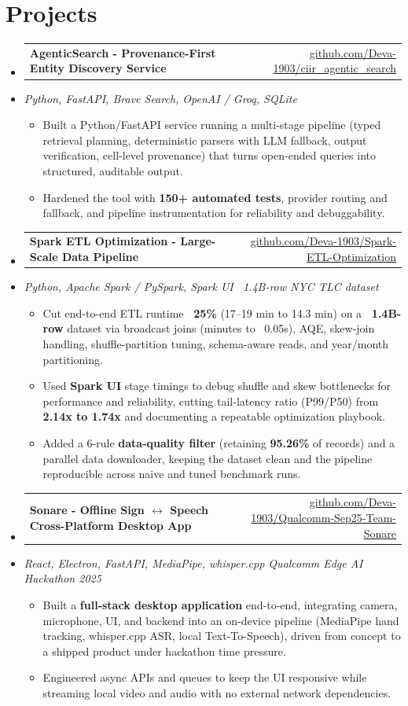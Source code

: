 \documentclass[letterpaper,10pt]{article}
\makeatletter
\newcommand{\resumeItem}[1]{
  \item\small{#1\vspace{-1pt}}
}
\newcommand{\resumeProjectHeading}[2]{
    \item
    \begin{tabular*}{0.985\textwidth}[t]{l@{\extracolsep{\fill}}r}
      \small\textbf{#1} & \small #2 \\
    \end{tabular*}\vspace{-5pt}
}
\newcommand{\resumeProjectSubheading}[1]{
  \vspace{-2pt}\item[] {\small\textcolor{ResumeSlate}{\emph{#1}}}\vspace{-3pt}
}
\newcommand{\resumeSubHeadingListStart}{\begin{itemize}[leftmargin=0.0in, label={}, itemsep=2pt, topsep=2pt]}
\newcommand{\resumeSubHeadingListEnd}{\end{itemize}}
\newcommand{\resumeItemListStart}{\begin{itemize}[leftmargin=0.18in, itemsep=2pt, topsep=1pt]}
\newcommand{\resumeItemListEnd}{\end{itemize}\vspace{-4pt}}
\makeatother
\begin{document}
\section{Projects}
\resumeSubHeadingListStart
  \resumeProjectHeading
    {AgenticSearch - Provenance-First Entity Discovery Service}
    {\href{https://github.com/Deva-1903/ciir_agentic_search}{github.com/Deva-1903/ciir\_agentic\_search}}
  \resumeProjectSubheading{Python, FastAPI, Brave Search, OpenAI / Groq, SQLite}
    \resumeItemListStart
      \resumeItem{Built a Python/FastAPI service running a multi-stage pipeline (typed retrieval planning, deterministic parsers with LLM fallback, output verification, cell-level provenance) that turns open-ended queries into structured, auditable output.}
      \resumeItem{Hardened the tool with \textbf{150+ automated tests}, provider routing and fallback, and pipeline instrumentation for reliability and debuggability.}
    \resumeItemListEnd
  \resumeProjectHeading
    {Spark ETL Optimization - Large-Scale Data Pipeline}
    {\href{https://github.com/Deva-1903/Spark-ETL-Optimization}{github.com/Deva-1903/Spark-ETL-Optimization}}
  \resumeProjectSubheading{Python, Apache Spark / PySpark, Spark UI \enspace\textbar\enspace ~1.4B-row NYC TLC dataset}
    \resumeItemListStart
      \resumeItem{Cut end-to-end ETL runtime \textbf{~25\%} (17--19 min to 14.3 min) on a \textbf{~1.4B-row} dataset via broadcast joins (minutes to ~0.05s), AQE, skew-join handling, shuffle-partition tuning, schema-aware reads, and year/month partitioning.}
      \resumeItem{Used \textbf{Spark UI} stage timings to debug shuffle and skew bottlenecks for performance and reliability, cutting tail-latency ratio (P99/P50) from \textbf{2.14x to 1.74x} and documenting a repeatable optimization playbook.}
      \resumeItem{Added a 6-rule \textbf{data-quality filter} (retaining \textbf{95.26\%} of records) and a parallel data downloader, keeping the dataset clean and the pipeline reproducible across naive and tuned benchmark runs.}
    \resumeItemListEnd
  \resumeProjectHeading
    {Sonare - Offline Sign \(\leftrightarrow\) Speech Cross-Platform Desktop App}
    {\href{https://github.com/Deva-1903/Qualcomm-Sep25-Team-Sonare}{github.com/Deva-1903/Qualcomm-Sep25-Team-Sonare}}
  \resumeProjectSubheading{React, Electron, FastAPI, MediaPipe, whisper.cpp \enspace\textbar\enspace Qualcomm Edge AI Hackathon 2025}
    \resumeItemListStart
      \resumeItem{Built a \textbf{full-stack desktop application} end-to-end, integrating camera, microphone, UI, and backend into an on-device pipeline (MediaPipe hand tracking, whisper.cpp ASR, local Text-To-Speech), driven from concept to a shipped product under hackathon time pressure.}
      \resumeItem{Engineered async APIs and queues to keep the UI responsive while streaming local video and audio with no external network dependencies.}
    \resumeItemListEnd
\resumeSubHeadingListEnd
\vspace{-4pt}
\end{document}

